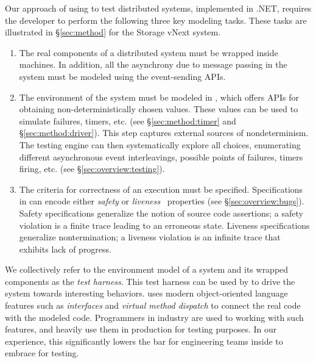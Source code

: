 Our approach of using \psharp to test distributed systems, implemented in .NET, requires the developer to perform the following three key modeling tasks. These tasks are illustrated in \S\ref{sec:method} for the \Azure Storage vNext system.

\begin{enumerate}
\item The real components of a distributed system must be wrapped inside \psharp machines. In addition, all the asynchrony due to message passing in the system must be modeled using the \psharp event-sending APIs. 

\item The environment of the system must be modeled in \psharp, which offers APIs for obtaining non-deterministically chosen values. These values can be used to simulate failures, timers, etc. (see \S\ref{sec:method:timer} and \S\ref{sec:method:driver}). This step captures external sources of nondeterminism. The \psharp testing engine can then systematically explore all choices, enumerating different asynchronous event interleavings, possible points of failures, timers firing, etc. (see \S\ref{sec:overview:testing}).

\item The criteria for correctness of an execution must be specified. Specifications in \psharp can encode either \emph{safety} or \emph{liveness}~\cite{lamport1977proving} properties (see \S\ref{sec:overview:bugs}). Safety specifications generalize the notion of source code assertions; a safety violation is a finite trace leading to an erroneous state. Liveness specifications generalize nontermination; a liveness violation is an infinite trace that exhibits lack of progress.

\end{enumerate}

\noindent
We collectively refer to the environment model of a system and its wrapped components as the \psharp \emph{test harness}. This test harness can be used by \psharp to drive the system towards interesting behaviors.
\psharp uses modern object-oriented language features such as \emph{interfaces} and \emph{virtual method dispatch} to connect the real code with the modeled code. Programmers in industry are used to working with such features, and heavily use them in production for testing purposes. In our experience, this significantly lowers the bar for engineering teams inside \Microsoft to embrace \psharp for testing.

